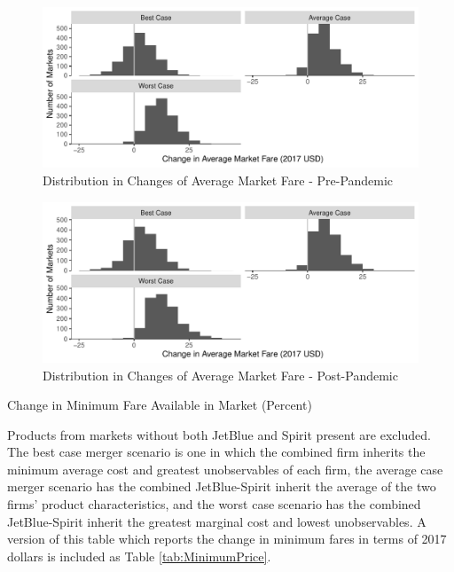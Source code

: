 \documentclass{article}
\begin{document}
    
    \begin{figure}
        \caption{Distribution in Changes of Average Market Fare - Pre-Pandemic}
        \label{fig:AverageFare_ChangeDist_PrePandemic}
        \begin{center}
        \includegraphics[width = \linewidth]{PrePandemic_Merger_Change_AverageFare_Dist.pdf}
        \end{center}
    \end{figure}

    \begin{figure}
        \caption{Distribution in Changes of Average Market Fare - Post-Pandemic}
        \label{fig:AverageFare_ChangeDist_PostPandemic}
        \begin{center}
        \includegraphics[width = \linewidth]{Merger_Change_AverageFare_Dist.pdf}
        \end{center}
    \end{figure}

    \begin{table}
        \caption{Change in Minimum Fare Available in Market (Percent)}
       \label{tab:MinimumPrice_Percent}
       \vspace{-15mm}
       \begin{center}
           
       \end{center}
       \vspace{-5mm}
       \footnotesize{Products from markets without both JetBlue and Spirit present are excluded. The best case merger scenario is one in which the combined firm inherits the minimum average cost and greatest unobservables of each firm, the average case merger scenario has the combined JetBlue-Spirit inherit the average of the two firms' product characteristics, and the worst case scenario has the combined JetBlue-Spirit inherit the greatest marginal cost and lowest unobservables. A version of this table which reports the change in minimum fares in terms of 2017 dollars is included as Table \ref{tab:MinimumPrice}.}
    \end{table}
\end{document}
